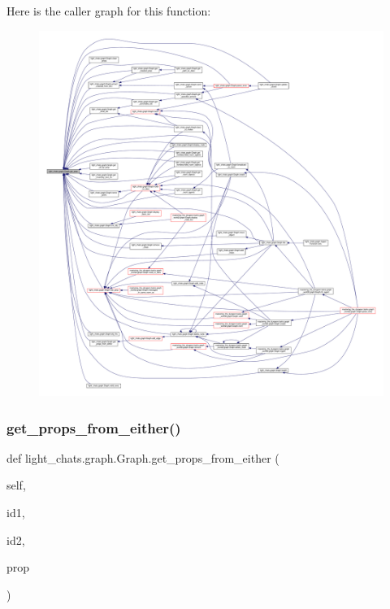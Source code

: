 Here is the caller graph for this function\+:
\nopagebreak
\begin{figure}[H]
\begin{center}
\leavevmode
\includegraphics[width=350pt]{classlight__chats_1_1graph_1_1Graph_a30483d3bbb88924bb7b98fb72b2e23fe_icgraph}
\end{center}
\end{figure}
\mbox{\label{classlight__chats_1_1graph_1_1Graph_ad12090e48ff11063ece35c115b91d2aa}} 
\subsubsection{\texorpdfstring{get\+\_\+props\+\_\+from\+\_\+either()}{get\_props\_from\_either()}}
{\footnotesize\ttfamily def light\+\_\+chats.\+graph.\+Graph.\+get\+\_\+props\+\_\+from\+\_\+either (\begin{DoxyParamCaption}\item[{}]{self,  }\item[{}]{id1,  }\item[{}]{id2,  }\item[{}]{prop }\end{DoxyParamCaption})}

